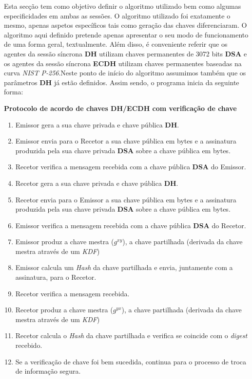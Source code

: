 \documentclass[11pt]{article}
\providecommand{\tightlist}{%
      \setlength{\itemsep}{0pt}\setlength{\parskip}{0pt}}
\begin{document}
    Esta secção tem como objetivo definir o algoritmo utilizado bem como
algumas especificidades em ambas as sessões. O algoritmo utilizado foi
exatamente o mesmo, apenas aspetos específicos tais como geração das
chaves diferenciaram. O algoritmo aqui definido pretende apenas
apresentar o seu modo de funcionamento de uma forma geral, textualmente.
Além disso, é conveniente referir que os agentes da sessão síncrona
\textbf{DH} utilizam chaves permanentes de 3072 bits \textbf{DSA} e os
agentes da sessão síncrona \textbf{ECDH} utilizam chaves permanentes
baseadas na curva \emph{NIST P-256}.Neste ponto de início do algoritmo
assumimos também que os parâmetros \textbf{DH} já estão definidos. Assim
sendo, o programa inicia da seguinte forma:

\textbf{Protocolo de acordo de chaves DH/ECDH com verificação de chave}

\begin{enumerate}
\def\labelenumi{\arabic{enumi}.}
\tightlist
\item
  Emissor gera a sua chave privada e chave pública \textbf{DH}.
\item
  Emissor envia para o Recetor a sua chave pública em bytes e a
  assinatura produzida pela sua chave privada \textbf{DSA} sobre a chave
  pública em bytes.
\item
  Recetor verifica a mensagem recebida com a chave pública \textbf{DSA}
  do Emissor.
\item
  Recetor gera a sua chave privada e chave pública \textbf{DH}.
\item
  Recetor envia para o Emissor a sua chave pública em bytes e a
  assinatura produzida pela sua chave privada \textbf{DSA} sobre a chave
  pública em bytes.
\item
  Emissor verifica a mensagem recebida com a chave pública \textbf{DSA}
  do Recetor.
\item
  Emissor produz a chave mestra (\(g^{xy}\)), a chave partilhada
  (derivada da chave mestra através de um \emph{KDF})
\item
  Emissor calcula um \emph{Hash} da chave partilhada e envia, juntamente
  com a assinatura, para o Recetor.
\item
  Recetor verifica a mensagem recebida.
\item
  Recetor produz a chave mestra (\(g^{yx}\)), a chave partilhada
  (derivada da chave mestra através de um \emph{KDF})
\item
  Recetor calcula o \emph{Hash} da chave partilhada e verifica se
  coincide com o \emph{digest} recebido.
\item
  Se a verificação de chave foi bem sucedida, continua para o processo
  de troca de informação segura.
\end{enumerate}
\end{document}
